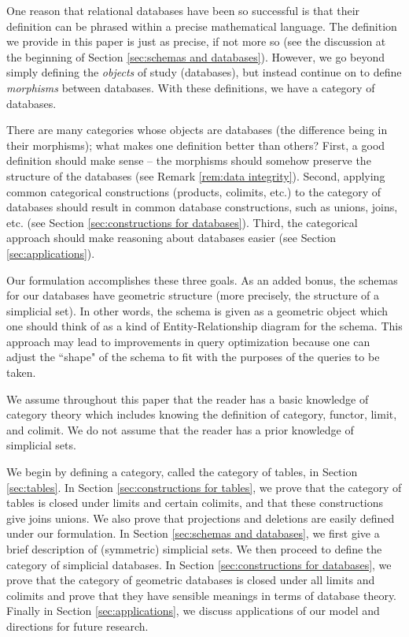 \documentclass{amsart}
\begin{document}
One reason that relational databases have been so successful is that their definition can be phrased within a precise mathematical language.  The definition we provide in this paper is just as precise, if not more so (see the discussion at the beginning of Section \ref{sec:schemas and databases}).  However, we go beyond simply defining the {\em objects} of study (databases), but instead continue on to define {\em morphisms} between databases.  With these definitions, we have a category of databases.

There are many categories whose objects are databases (the difference being in their morphisms); what makes one definition better than others?  First, a good definition should make sense -- the morphisms should somehow preserve the structure of the databases (see Remark \ref{rem:data integrity}).  Second, applying common categorical constructions (products, colimits, etc.) to the category of databases should result in common database constructions, such as unions, joins, etc. (see Section \ref{sec:constructions for databases}).  Third, the categorical approach should make reasoning about databases easier (see Section \ref{sec:applications}).

Our formulation accomplishes these three goals.  As an added bonus, the schemas for our databases have geometric structure (more precisely, the structure of a simplicial set).  In other words, the schema is given as a geometric object which one should think of as a kind of Entity-Relationship diagram for the schema.  This approach may lead to improvements in query optimization because one can adjust the ``shape" of the schema to fit with the purposes of the queries to be taken.

We assume throughout this paper that the reader has a basic knowledge of category theory which includes knowing the definition of category, functor, limit, and colimit.  We do not assume that the reader has a prior knowledge of simplicial sets.

We begin by defining a category, called the category of tables, in Section \ref{sec:tables}.  In Section \ref{sec:constructions for tables}, we prove that the category of tables is closed under limits and certain colimits, and that these constructions give joins unions.  We also prove that projections and deletions are easily defined under our formulation.  In Section \ref{sec:schemas and databases}, we first give a brief description of (symmetric) simplicial sets.  We then proceed to define the category of simplicial databases.  In Section \ref{sec:constructions for databases}, we prove that the category of geometric databases is closed under all limits and colimits and prove that they have sensible meanings in terms of database theory.  Finally in Section \ref{sec:applications}, we discuss applications of our model and directions for future research.
\end{document}
